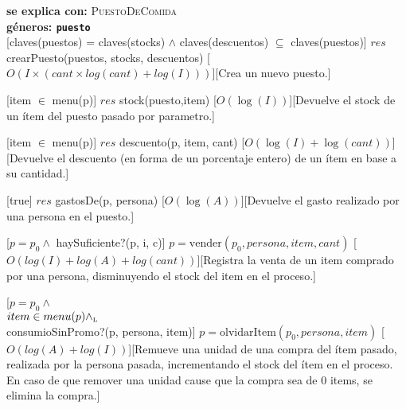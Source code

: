 \documentclass[../main.tex]{subfiles}
\begin{document}
\begin{interfaz} 
{
\noindent \textbf{se explica con: }\textsc{PuestoDeComida} \\
\textbf{géneros: \texttt{puesto}} \\

                  {\puesto}
[claves(puestos) = claves(stocks) $\land$  claves(descuentos) $\subseteq$ claves(puestos)]%
{$res$ \igobs crearPuesto(puestos, stocks, descuentos)}%
[$O(I \times (cant \times log(cant) + log(I)))$][Crea un nuevo puesto.] \nln

[item $\in$ menu(p)]
{$res$ \igobs stock(puesto,item)}
[$O(\log(I))$][Devuelve el stock de un ítem del puesto pasado por parametro.]   

[item $\in$ menu(p)]
{$res$ \igobs descuento(p, item, cant)}
[$O(\log(I) + \log(cant))$][Devuelve el descuento (en forma de un porcentaje entero) de un ítem en base a su cantidad.]   

[true]
{$res$ \igobs gastosDe(p, persona)}
[$O(\log (A))$][Devuelve el gasto realizado por una persona en el puesto.]   

[$p = p_0 \land$
haySuficiente?(p, i, c)]
{$p = \text{vender}(p_0, persona, item, cant)$}
[$O(log (I) + log (A) + log (cant))$][Registra la venta de un item comprado por una persona, disminuyendo el stock del item en el proceso.]

[$p = p_0 \land$ \\
$item \in menu(p) \land_{\mathrm{\scriptscriptstyle{L}}}$\\
consumioSinPromo?(p, persona, item)]
{$p = \text{olvidarItem}(p_0, persona, item)$}
[$O(log (A) + log (I))$][Remueve una unidad de una compra del ítem pasado, realizada por la persona pasada, incrementando el 
stock del ítem en el proceso. En caso de que remover una unidad cause que la compra sea de 0 items, se elimina la compra.]

}
\end{interfaz}
\end{document}
